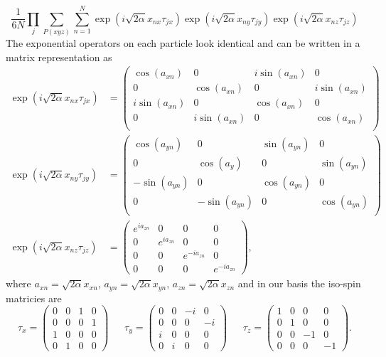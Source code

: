 \begin{equation}
   \frac{1}{6N} \prod\limits_j \sum\limits_{P(xyz)} \sum\limits_{n=1}^N \exp{\left(i\sqrt{2\alpha}x_{nx} \tau_{jx}\right)} \exp{\left(i\sqrt{2\alpha}x_{ny} \tau_{jy}\right)} \exp{\left(i\sqrt{2\alpha}x_{nz} \tau_{jz}\right)}
\end{equation}
The exponential operators on each particle look identical and can be written in a matrix representation as
\begin{align}
\exp\left(i\sqrt{2\alpha}x_{nx}\tau_{jx}\right) &=
\begin{pmatrix}
    \cos(a_{xn}) & 0 & i\sin(a_{xn}) & 0 \\
    0 & \cos(a_{xn}) & 0 & i\sin(a_{xn}) \\
    i\sin(a_{xn}) & 0 & \cos(a_{xn}) & 0 \\
    0 & i\sin(a_{xn}) & 0 & \cos(a_{xn}) \\
\end{pmatrix} \\
\exp\left(i\sqrt{2\alpha}x_{ny}\tau_{jy}\right) &=
\begin{pmatrix}
    \cos(a_{yn}) & 0 & \sin(a_{yn}) & 0 \\
    0 & \cos(a_y) & 0 & \sin(a_{yn}) \\
    -\sin(a_{yn}) & 0 & \cos(a_{yn}) & 0 \\
    0 & -\sin(a_{yn}) & 0 & \cos(a_{yn}) \\
\end{pmatrix} \\
\exp\left(i\sqrt{2\alpha}x_{nz}\tau_{jz}\right) &=
\begin{pmatrix}
    e^{ia_{zn}} & 0 & 0 & 0 \\
    0 & e^{ia_{zn}} & 0 & 0 \\
    0 & 0 & e^{-ia_{zn}} & 0 \\
    0 & 0 & 0 & e^{-ia_{zn}}
\end{pmatrix},
\end{align}
where $a_{xn}=\sqrt{2\alpha}x_{xn}$, $a_{yn}=\sqrt{2\alpha}x_{yn}$, $a_{zn}=\sqrt{2\alpha}x_{zn}$ and in our basis the iso-spin matricies are
\begin{equation}
\tau_x=
\begin{pmatrix}
    0 & 0 & 1 & 0 \\
    0 & 0 & 0 & 1 \\
    1 & 0 & 0 & 0 \\
    0 & 1 & 0 & 0
\end{pmatrix}
~~~~~~~\tau_y=
\begin{pmatrix}
    0 & 0 & -i & 0 \\
    0 & 0 & 0 & -i \\
    i & 0 & 0 & 0 \\
    0 & i & 0 & 0
\end{pmatrix}
~~~~~~~\tau_z=
\begin{pmatrix}
    1 & 0 & 0 & 0 \\
    0 & 1 & 0 & 0 \\
    0 & 0 & -1 & 0 \\
    0 & 0 & 0 & -1
\end{pmatrix}.
\end{equation}
